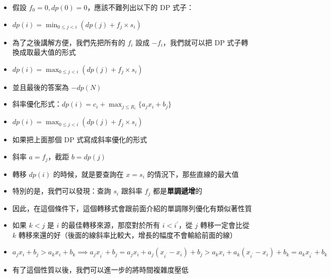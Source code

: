 \documentclass[standalone]{beamer}
\begin{document}
\begin{frame}{}
  \begin{itemize}
    \item 假設 $f_0 = 0, dp(0) = 0$，應該不難列出以下的 DP 式子：
    \item $dp(i) = \min_{0 \leq j < i}(dp(j) + f_j \times s_i)$
    \item 為了之後講解方便，我們先把所有的 $f_i$ 設成 $-f_i$，我們就可以把 DP 式子轉換成取最大值的形式
    \item $dp(i) = \max_{0 \leq j < i}(dp(j) + f_j \times s_i)$
    \item 並且最後的答案為 $-dp(N)$
  \end{itemize}
\end{frame}

\begin{frame}{}
  \begin{itemize}
    \item 斜率優化形式：$dp(i) = c_i + \max_{j \leq R_i} \{a_jx_i + b_j\}$
    \item $dp(i) = \max_{0 \leq j < i}(dp(j) + f_j \times s_i)$
    \item 如果把上面那個 DP 式寫成斜率優化的形式
    \item 斜率 $a = f_j$，截距 $b = dp(j)$
    \item 轉移 $dp(i)$ 的時候，就是要查詢在 $x = s_i$ 的情況下，那些直線的最大值
    \item 特別的是，我們可以發現：查詢 $s_i$ 跟斜率 $f_j$ 都是\textbf{單調遞增}的
  \end{itemize}
\end{frame}

\begin{frame}{}
  \begin{itemize}
    \item 因此，在這個條件下，這個轉移式會跟前面介紹的單調隊列優化有類似著性質
    \item 如果 $k < j$ 是 $i$ 的最佳轉移來源，那麼對於所有 $i < i^\prime$，從 $j$ 轉移一定會比從 $k$ 轉移來還的好（後面的線斜率比較大，增長的幅度不會輸給前面的線）
    \item $a_jx_i + b_j > a_kx_i + b_k \implies a_jx_{i^\prime} + b_j = a_jx_i + a_j(x_{i^\prime} - x_i) + b_j > a_kx_i + a_k(x_{i^\prime} - x_i) + b_k = a_kx_{i^\prime} + b_k$
    \item 有了這個性質以後，我們可以進一步的將時間複雜度壓低
  \end{itemize}
\end{frame}
\end{document}
